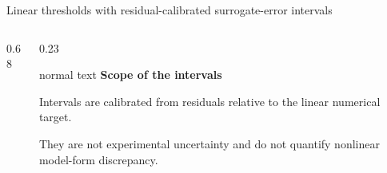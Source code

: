 \documentclass[aspectratio=169,10pt]{beamer}
\begin{document}
\begin{frame}[t]{\fontsize{13}{15}\selectfont Linear thresholds with residual-calibrated surrogate-error intervals}
  \hypertarget{supp:surrogates-linear-threshold-intervals}{}
  \vspace{-0.18cm}\hfill
  \hspace{0.10cm}\GVBackupIndexButton
  \vspace{0.04cm}
  \begin{columns}[T,totalwidth=0.95\textwidth]
    \begin{column}{0.68\textwidth}
      \centering
    \end{column}
    \begin{column}{0.23\textwidth}
      \begin{beamercolorbox}[wd=\linewidth,sep=0.50em]{normal text}
        \small\textbf{\color{GVTitleRed}Scope of the intervals}\par
        \vspace{0.09cm}\scriptsize
        Intervals are calibrated from residuals relative to the linear numerical target.\par
        \vspace{0.14cm}
        They are not experimental uncertainty and do not quantify nonlinear model-form discrepancy.
      \end{beamercolorbox}
    \end{column}
  \end{columns}
\end{frame}
\end{document}
